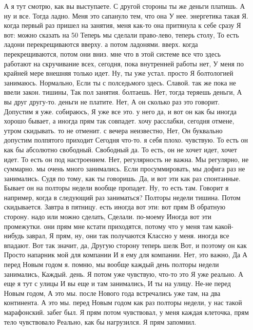 А я тут смотрю, как вы выступаете. С другой стороны ты же деньги платишь. А ну и все. Тогда ладно. Меня это сапануло тем, что она У нее.
энергетика такая Я. когда первый раз пришел на занятия, меня как-то она притянула к себе сразу Я вот:
можно сказать на 50%
Теперь мы сделали право-лево, теперь столу, То есть ладони перекрещиваются вверху.
а потом ладонями.
вверх. когда перекрещиваются, потом они вниз.
мне что в этой системе все что здесь работают на скручивание всех,
сегодня, пока внутренней работы нет, У меня по крайней мере внешняя только идет. Ну, ты уже устал. просто Я болтологией занимаюсь. Нормально, Если
ты с полседьмого здесь.
Славой. так же пока не ввели закон.
тишины, Так пол занятия.
болтаешь. Нет, тогда теряешь деньги, А вы друг другу-то.
деньги не платите.
Нет, А он сколько раз это говорит. Допустим я уже.
собираюсь, Я уже все это.
у него да, и вот он как бы иногда хорошо бывает, а иногда прям так совпадет. хочу расслабки, сегодня отмене, утром скидывать.
то не отменит. с вечера неизвестно, Нет, Он буквально допустим полпятого приходит Сегодня что-то.
я себя плохо.
чувствую.
То есть он как бы абсолютно свободный.
Свободный да.
То есть, он не хочет идет, хочет идет.
То есть он под настроением.
Нет, регулярность не важна.
Мы регулярно, не суммарно. мы очень много занимались.
Если просуммировать, мы дофига раз не занимались.
Судя по тому, как ты говоришь.
Да, и вот эти как раз спонтанные.
Бывает он на полторы недели вообще пропадет.
Ну, то есть там.
Говорит я например, когда в следующий раз заниматься?
Полторы недели тишина.
Потом скидывается.
Завтра в пятницу.
есть иногда вот эти:
вот прям В обратную сторону. надо или можно сделать, Сделали.
по-моему Иногда вот эти промежутки.
они прям мне кстати приходятся, потому что у меня там какой-нибудь заврал, Я прям, ну, они так получаются Классно у меня.
иногда все впадают. Вот так значит, да, Другую сторону теперь шелк Вот, и поэтому он как Просто напарник мой для компании И я ему для компании.
Нет, это важно, Да А перед Новым годом я.
помню, мы вообще каждый день полторы недели занимались, Каждый.
день. Я потом уже чувствую, что-то это Я уже реально. А еще я тут с улицы И вы еще и там занимались, И ты на улицу.
Не-не перед Новым годом, А это мы. после Нового года встречались уже там, на два континента. А это мы.
перед Новым годом как раз полторы недели, у нас такой марафонский.
забег был. Я прям потом чувствовал, у меня каждая клеточка, прям тело чувствовало Реально, как бы нагрузился. Я прям запомнил.
